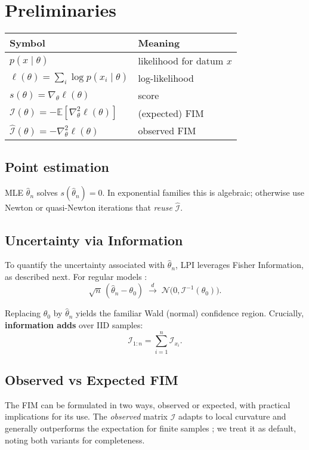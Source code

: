 \documentclass[11pt]{article}
\begin{document}
\section{Preliminaries}

\begin{table}[h!]
\centering
\begin{tabular}{ll}
\toprule
Symbol & Meaning \\
\midrule
$p(x\mid\theta)$ & likelihood for datum $x$ \\
$\ell(\theta)=\sum_i\log p(x_i\mid\theta)$ & log-likelihood \\
$s(\theta)=\nabla_\theta \ell(\theta)$ & score \\
$\mathcal I(\theta)= -\mathbb E[\nabla^2_\theta \ell(\theta)]$ & (expected) FIM \\
$\hat{\mathcal I}(\theta)= -\nabla^2_\theta \ell(\theta)$ & observed FIM \\
\bottomrule
\end{tabular}
\end{table}

\subsection{Point estimation}
MLE $\hat\theta_n$ solves $s(\hat\theta_n)=0$. In exponential families this is algebraic; otherwise use Newton or quasi-Newton iterations that \textit{reuse} $\hat{\mathcal I}$.

\subsection{Uncertainty via Information}
To quantify the uncertainty associated with $\hat\theta_n$, LPI leverages Fisher Information, as described next. For regular models \cite{lehmann1998theory, vanderVaart1998asymptotic}:
\begin{equation}
\sqrt{n}\,(\hat\theta_n-\theta_0)\;\xrightarrow{d}\;\mathcal N\bigl(0,\mathcal I^{-1}(\theta_0)\bigr).
\end{equation}

Replacing $\theta_0$ by $\hat\theta_n$ yields the familiar Wald (normal) confidence region. Crucially, \textbf{information adds} over IID samples:
\begin{equation}
\mathcal I_{1:n} = \sum_{i=1}^n \mathcal I_{x_i}.
\end{equation}

\subsection{Observed vs Expected FIM}
The FIM can be formulated in two ways, observed or expected, with practical implications for its use. The \textit{observed} matrix $\hat{\mathcal I}$ adapts to local curvature and generally outperforms the expectation for finite samples \cite{efron1978assessing}; we treat it as default, noting both variants for completeness.
\end{document}
